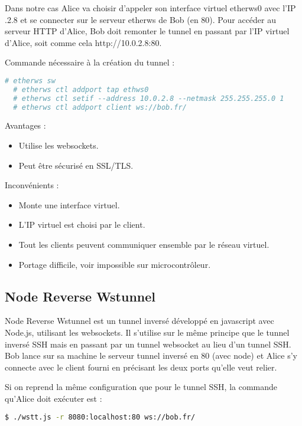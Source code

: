 Dans notre cas Alice va choisir d'appeler son interface virtuel \og etherws0 \fg{} avec l'IP .2.8 \fg{} et se connecter sur le serveur etherws de Bob (en 80). Pour accéder au serveur HTTP d'Alice, Bob doit remonter le tunnel en passant par l'IP virtuel d'Alice, soit comme cela http://10.0.2.8:80.

\noindent Commande nécessaire à la création du tunnel :
\begin{lstlisting}[language=bash]
  # etherws sw
  # etherws ctl addport tap ethws0
  # etherws ctl setif --address 10.0.2.8 --netmask 255.255.255.0 1
  # etherws ctl addport client ws://bob.fr/
\end{lstlisting}

Avantages :
\begin{itemize}
    \item Utilise les websockets.
    \item Peut être sécurisé en SSL/TLS.
\end{itemize}

Inconvénients :
\begin{itemize}
    \item Monte une interface virtuel.
    \item L'IP virtuel est choisi par le client.
    \item Tout les clients peuvent communiquer ensemble par le réseau virtuel.
    \item Portage difficile, voir impossible sur microcontrôleur.
\end{itemize}

\subsection{Node Reverse Wstunnel}

Node Reverse Wstunnel est un tunnel inversé développé en javascript avec Node.js, utilisant les websockets. Il s'utilise sur le même principe que le tunnel inversé SSH mais en passant par un tunnel websocket au lieu d'un tunnel SSH. Bob lance sur sa machine le serveur tunnel inversé en 80 (avec node) et Alice s'y connecte avec le client fourni en précisant les deux ports qu'elle veut relier.

\noindent Si on reprend la même configuration que pour le tunnel SSH, la commande qu'Alice doit exécuter est :
\begin{lstlisting}[language=bash]
  $ ./wstt.js -r 8080:localhost:80 ws://bob.fr/
\end{lstlisting}

